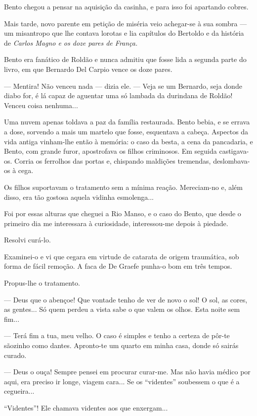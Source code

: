 Bento chegou a pensar na aquisição da casinha, e para isso foi apartando
cobres.

Mais tarde, novo parente em petição de miséria veio achegar-se à sua
sombra --- um misantropo que lhe contava lorotas e lia capítulos do
Bertoldo e da história de \emph{Carlos Magno e os doze pares de França.}

Bento era fanático de Roldão e nunca admitiu que fosse lida a segunda
parte do livro, em que Bernardo Del Carpio vence os doze pares.

--- Mentira! Não venceu nada --- dizia ele. --- Veja se um Bernardo,
seja donde diabo for, é lá capaz de aguentar uma só lambada da durindana
de Roldão! Venceu coisa nenhuma...

Uma nuvem apenas toldava a paz da família restaurada. Bento bebia, e se
errava a dose, sorvendo a mais um martelo que fosse, esquentava a
cabeça. Aspectos da vida antiga vinham-lhe então à memória: o caso da
besta, a cena da pancadaria, e Bento, com grande furor, apostrofava os
filhos criminosos. Em seguida castigava-os. Corria os ferrolhos das
portas e, chispando maldições tremendas, deslombava-os à cega.

Os filhos suportavam o tratamento sem a mínima reação. Mereciam-no e,
além disso, era tão gostosa aquela vidinha esmolenga...

Foi por essas alturas que cheguei a Rio Manso, e o caso do Bento, que
desde o primeiro dia me interessara à curiosidade, interessou-me depois
à piedade.

Resolvi curá-lo.

Examinei-o e vi que cegara em virtude de catarata de origem traumática,
sob forma de fácil remoção. A faca de De Graefe punha-o bom em três
tempos.

Propus-lhe o tratamento.

--- Deus que o abençoe! Que vontade tenho de ver de novo o sol! O sol,
as cores, as gentes... Só quem perdeu a vista sabe o que valem os olhos.
Esta noite sem fim...

--- Terá fim a tua, meu velho. O caso é simples e tenho a certeza de
pôr-te sãozinho como dantes. Apronto-te um quarto em minha casa, donde
só sairás curado.

--- Deus o ouça! Sempre pensei em procurar curar-me. Mas não havia
médico por aqui, era preciso ir longe, viagem cara... Se os ``videntes''
soubessem o que é a cegueira...

``Videntes''! Ele chamava videntes aos que enxergam...

